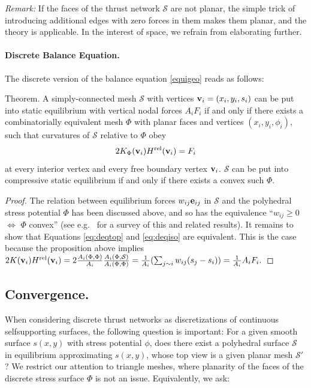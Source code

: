 \documentclass[annual]{acmsiggraph}
\def\rel{{\mathord{{\rm rel}}}}
\def\SS{{\mathcal S}}
\begin{document}
{\em Remark:} If the faces of the thrust network $\SS$ are not planar,
the simple trick of introducing additional edges with zero forces in them
makes them planar, and the theory is applicable. In the interest of space, we refrain from elaborating further.


\paragraph{Discrete Balance Equation.}

The discrete version of the balance equation \eqref{equigeo} reads as
follows:

\proclaim Theorem.
 A simply-connected mesh $\SS$ with vertices ${\mathbf v}_i=(x_i,y_i,s_i)$
can be put into static equilibrium with vertical nodal forces $A_iF_i$ if
and only if there exists a combinatorially equivalent mesh $\Phi$ with
planar faces and vertices $(x_i,y_i,\phi_i)$, such that curvatures of
$\SS$ relative to $\Phi$ obey
	\begin{equation}
	2 K_\Phi(\vw_i) H^\rel(\vw_i) = F_i
	\label{eq:deqiso}
	\end{equation}
 at every interior vertex and every free boundary vertex ${\mathbf v}_i$. $\SS$
can be put into compressive static equilibrium if and only if there exists
a convex such $\Phi$.

\begin{proof} The relation between equilibrium forces $w_{ij}{\mathbf e}_{ij}$ in
$\SS$ and the polyhedral stress potential $\Phi$ has been discussed above,
and so has the equivalence ``$w_{ij}\ge 0$ $\iff$ $\Phi$ convex'' (see
e.g.\ \cite{Ash1988} for a survey of this and related results). It remains
to show that Equations \eqref{eq:deqtop} and \eqref{eq:deqiso} are
equivalent. This is the case because the proposition above implies
	$
	2 K(\vw_i) H^\rel(\vw_i) =
	2 \frac{A_i(\Phi,\Phi)}{A_i}
	\frac{A_i(\Phi,\SS)}{A_i(\Phi,\Phi)} =
	{1\over A_i}
	(\sum_{j\sim i} w_{ij} (s_j-s_i))
	= {1\over A_i} A_i F_i.
	$
	\end{proof}

\subsection{Convergence.} \label{sec:convergence}

When considering discrete thrust networks as discretizations of continuous
self\dash supporting surfaces, the following question is important: For a
given smooth surface $s(x,y)$ with stress potential $\phi$, does there
exist a polyhedral surface $\SS$ in equilibrium approximating $s(x,y)$,
whose top view is a given planar mesh $\SS'$? We restrict our attention to
triangle meshes, where planarity of the faces of the discrete stress
surface $\Phi$ is not an issue. Equivalently, we ask:
\end{document}
